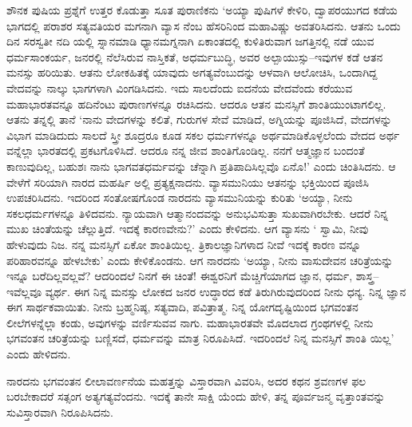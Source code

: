 ಶೌನಕ ಪುಷಿಯ ಪ್ರಶ್ನೆಗೆ ಉತ್ತರ ಕೊಡುತ್ತಾ ಸೂತ ಪುರಾಣಿಕನು ‘ಅಯ್ಯಾ ಪುಷಿಗಳೆ ಕೇಳಿರಿ, ದ್ವಾಪರಯುಗದ ಕಡೆಯ ಭಾಗದಲ್ಲಿ ಪರಾಶರ ಸತ್ಯವತಿಯರ ಮಗನಾಗಿ ವ್ಯಾಸ ನೆಂಬ ಹೆಸರಿನಿಂದ ಮಹಾವಿಷ್ಣು ಅವತರಿಸಿದನು. ಆತನು ಒಂದು ದಿನ ಸರಸ್ವತೀ ನದಿ ಯಲ್ಲಿ ಸ್ನಾನಮಾಡಿ ಧ್ಯಾನಮಗ್ನನಾಗಿ ಏಕಾಂತದಲ್ಲಿ ಕುಳಿತಿರುವಾಗ ಜಗತ್ತಿನಲ್ಲಿ ನಡೆ ಯುವ ಧರ್ಮಸಾಂಕರ್ಯ, ಜನರಲ್ಲಿ ನೆಲೆಸಿರುವ ನಾಸ್ತಿಕತೆ, ಅಧರ್ಮಬುದ್ಧಿ, ಅವರ ಅಲ್ಪಾಯುಸ್ಸು–ಇವುಗಳ ಕಡೆ ಆತನ ಮನಸ್ಸು ಹರಿಯಿತು. ಆತನು ಲೋಕಹಿತಕ್ಕೆ ಯಾವುದು ಅಗತ್ಯವೆಂಬುದನ್ನು ಆಳವಾಗಿ ಆಲೋಚಿಸಿ, ಒಂದಾಗಿದ್ದ ವೇದವನ್ನು ನಾಲ್ಕು ಭಾಗಗಳಾಗಿ ವಿಂಗಡಿಸಿದನು. ಇದು ಸಾಲದೆಂದು ಐದನೆಯ ವೇದವೆಂದು ಕರೆಯುವ ಮಹಾಭಾರತವನ್ನೂ ಹದಿನೆಂಟು ಪುರಾಣಗಳನ್ನೂ ರಚಿಸಿದನು. ಆದರೂ ಆತನ ಮನಸ್ಸಿಗೆ ಶಾಂತಿಯುಂಟಾಗಲಿಲ್ಲ. ಆತನು ತನ್ನಲ್ಲಿ ತಾನೆ ‘ನಾನು ವೇದಗಳನ್ನು ಕಲಿತೆ, ಗುರುಗಳ ಸೇವೆ ಮಾಡಿದೆ, ಅಗ್ನಿಯನ್ನು ಪೂಜಿಸಿದೆ, ವೇದಗಳನ್ನು ವಿಭಾಗ ಮಾಡಿದುದು ಸಾಲದೆ ಸ್ತ್ರೀ ಶೂದ್ರರೂ ಕೂಡ ಸಕಲ ಧರ್ಮಗಳನ್ನೂ ಅರ್ಥಮಾಡಿಕೊಳ್ಳಲೆಂದು ವೇದದ ಅರ್ಥ ವನ್ನೆಲ್ಲಾ ಭಾರತದಲ್ಲಿ ಪ್ರಕಟಗೊಳಿಸಿದೆ. ಆದರೂ ನನ್ನ ಜೀವ ಶಾಂತಿಗೊಂಡಿಲ್ಲ. ನನಗೆ ಆತ್ಮಜ್ಞಾನ ಬಂದಂತೆ ಕಾಣುವುದಿಲ್ಲ, ಬಹುಶಃ ನಾನು ಭಾಗವತಧರ್ಮವನ್ನು ಚೆನ್ನಾಗಿ ಪ್ರತಿಪಾದಿಸಿಲ್ಲವೊ ಏನೊ!’ ಎಂದು ಚಿಂತಿಸಿದನು. ಆ ವೇಳೆಗೆ ಸರಿಯಾಗಿ ನಾರದ ಮಹರ್ಷಿ ಅಲ್ಲಿ ಪ್ರತ್ಯಕ್ಷನಾದನು. ವ್ಯಾಸಮುನಿಯು ಆತನನ್ನು ಭಕ್ತಿಯಿಂದ ಪೂಜಿಸಿ ಉಪಚರಿಸಿದನು. ಇದರಿಂದ ಸಂತೋಷಗೊಂಡ ನಾರದನು ವ್ಯಾಸಮುನಿಯನ್ನು ಕುರಿತು ‘ಅಯ್ಯಾ, ನೀನು ಸಕಲಧರ್ಮಗಳನ್ನೂ ತಿಳಿದವನು. ನ್ಯಾಯವಾಗಿ ಆತ್ಮಾನಂದವನ್ನು ಅನುಭವಿಸುತ್ತಾ ಸುಖವಾಗಿರಬೇಕು. ಆದರೆ ನಿನ್ನ ಮುಖ ಚಿಂತೆಯನ್ನು ಚೆಲ್ಲುತ್ತಿದೆ. ಇದಕ್ಕೆ ಕಾರಣವೇನು?’ ಎಂದು ಕೇಳಿದನು. ಆಗ ವ್ಯಾಸನು ‘ ಸ್ವಾಮಿ, ನೀವು ಹೇಳುವುದು ನಿಜ. ನನ್ನ ಮನಸ್ಸಿಗೆ ಏಕೋ ಶಾಂತಿಯಿಲ್ಲ. ತ್ರಿಕಾಲಜ್ಞಾನಿಗಳಾದ ನೀವೆ ಇದಕ್ಕೆ ಕಾರಣ ವನ್ನೂ ಪರಿಹಾರವನ್ನೂ ಹೇಳಬೇಕು’ ಎಂದು ಕೇಳಿಕೊಂಡನು. ಆಗ ನಾರದನು ‘ಅಯ್ಯಾ, ನೀನು ವಾಸುದೇವನ ಚರಿತ್ರೆಯನ್ನು ಇನ್ನೂ ಬರೆದಿಲ್ಲವಲ್ಲವೆ? ಆದರಿಂದಲೆ ನಿನಗೆ ಈ ಚಿಂತೆ! ಈಶ್ವರನಿಗೆ ಮೆಚ್ಚಿಗೆಯಾಗದ ಜ್ಞಾನ, ಧರ್ಮ, ಶಾಸ್ತ್ರ–ಇವೆಲ್ಲವೂ ವ್ಯರ್ಥ. ಈಗ ನಿನ್ನ ಮನಸ್ಸು ಲೋಕದ ಜನರ ಉದ್ಧಾರದ ಕಡೆ ತಿರುಗಿರುವುದರಿಂದ ನೀನು ಧನ್ಯ. ನಿನ್ನ ಜ್ಞಾನ ಈಗ ಸಾರ್ಥಕವಾಯಿತು. ನೀನು ಬ್ರಹ್ಮನಿಷ್ಠ, ಸತ್ಯವಾದಿ, ಪವಿತ್ರಾತ್ಮ. ನಿನ್ನ ಯೋಗದೃಷ್ಟಿಯಿಂದ ಭಗವಂತನ ಲೀಲೆಗಳನ್ನೆಲ್ಲಾ ಕಂಡು, ಅವುಗಳನ್ನು ವರ್ಣಿಸುವವ ನಾಗು. ಮಹಾಭಾರತವೇ ಮೊದಲಾದ ಗ್ರಂಥಗಳಲ್ಲಿ ನೀನು ಭಗವಂತನ ಚರಿತ್ರೆಯನ್ನು ಬಣ್ಣಿಸದೆ, ಧರ್ಮವನ್ನು ಮಾತ್ರ ನಿರೂಪಿಸಿದೆ. ಇದರಿಂದಲೆ ನಿನ್ನ ಮನಸ್ಸಿಗೆ ಶಾಂತಿ ಯಿಲ್ಲ’ ಎಂದು ಹೇಳಿದನು.

ನಾರದನು ಭಗವಂತನ ಲೀಲಾವರ್ಣನೆಯ ಮಹತ್ತನ್ನು ವಿಸ್ತಾರವಾಗಿ ವಿವರಿಸಿ, ಅದರ ಕಥನ ಶ್ರವಣಗಳ ಫಲ ಬರಬೇಕಾದರೆ ಸತ್ಸಂಗ ಅತ್ಯಗತ್ಯವೆಂದನು. ಇದಕ್ಕೆ ತಾನೇ ಸಾಕ್ಷಿ ಯೆಂದು ಹೇಳಿ, ತನ್ನ ಪೂರ್ವಜನ್ಮ ವೃತ್ತಾಂತವನ್ನು ಸುವಿಸ್ತಾರವಾಗಿ ನಿರೂಪಿಸಿದನು.


